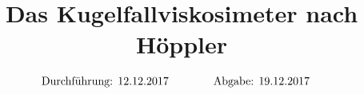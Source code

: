

\subject{v107}
\title{Das Kugelfallviskosimeter nach Höppler}

\date{
  \begin{align}
    \text{Durchführung: } & \text{12.12.2017} & \hspace{3em} & \text{Abgabe: 19.12.2017} \notag
  \end{align}
}




\maketitle
\thispagestyle{empty}
\tableofcontents
\newpage






\nocite{*}
\printbibliography{}


